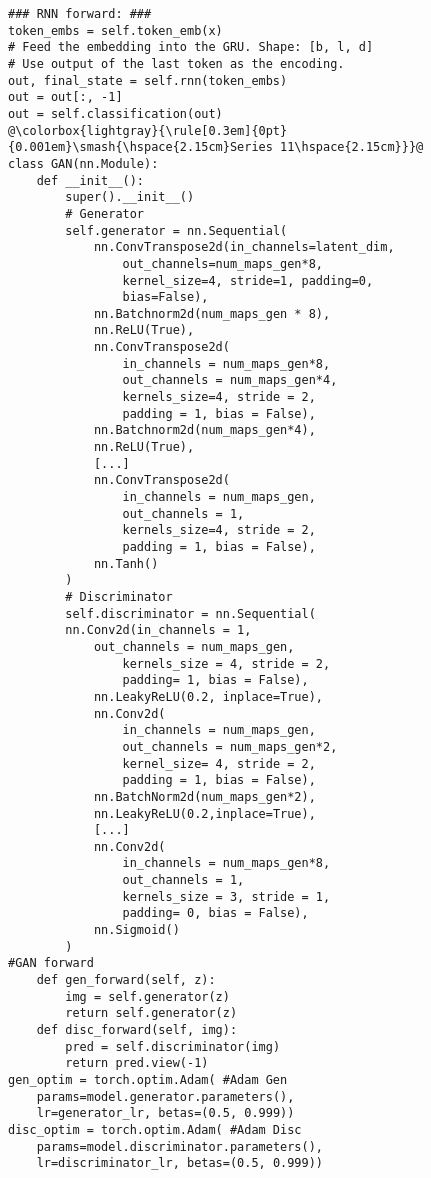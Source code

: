 \begin{lstlisting}[style=mypython]
### RNN forward: ###
token_embs = self.token_emb(x)
# Feed the embedding into the GRU. Shape: [b, l, d]
# Use output of the last token as the encoding.
out, final_state = self.rnn(token_embs)
out = out[:, -1]
out = self.classification(out)
@\colorbox{lightgray}{\rule[0.3em]{0pt}{0.001em}\smash{\hspace{2.15cm}Series 11\hspace{2.15cm}}}@
class GAN(nn.Module):
    def __init__():
        super().__init__()
        # Generator
        self.generator = nn.Sequential(
            nn.ConvTranspose2d(in_channels=latent_dim,
                out_channels=num_maps_gen*8,
                kernel_size=4, stride=1, padding=0,
                bias=False),
            nn.Batchnorm2d(num_maps_gen * 8),
            nn.ReLU(True),
            nn.ConvTranspose2d(
                in_channels = num_maps_gen*8, 
                out_channels = num_maps_gen*4,
                kernels_size=4, stride = 2,
                padding = 1, bias = False),
            nn.Batchnorm2d(num_maps_gen*4),
            nn.ReLU(True),
            [...]
            nn.ConvTranspose2d(
                in_channels = num_maps_gen,
                out_channels = 1,
                kernels_size=4, stride = 2,
                padding = 1, bias = False),
            nn.Tanh()
        )
        # Discriminator
        self.discriminator = nn.Sequential(
        nn.Conv2d(in_channels = 1,
            out_channels = num_maps_gen,
                kernels_size = 4, stride = 2,
                padding= 1, bias = False),
            nn.LeakyReLU(0.2, inplace=True),
            nn.Conv2d(
                in_channels = num_maps_gen,
                out_channels = num_maps_gen*2,
                kernel_size= 4, stride = 2,
                padding = 1, bias = False),
            nn.BatchNorm2d(num_maps_gen*2),
            nn.LeakyReLU(0.2,inplace=True),
            [...]
            nn.Conv2d(
                in_channels = num_maps_gen*8,
                out_channels = 1, 
                kernels_size = 3, stride = 1,
                padding= 0, bias = False),
            nn.Sigmoid()
        )
#GAN forward
    def gen_forward(self, z):    
        img = self.generator(z)
        return self.generator(z)
    def disc_forward(self, img):
        pred = self.discriminator(img)
        return pred.view(-1)
gen_optim = torch.optim.Adam( #Adam Gen
    params=model.generator.parameters(), 
    lr=generator_lr, betas=(0.5, 0.999))
disc_optim = torch.optim.Adam( #Adam Disc
    params=model.discriminator.parameters(), 
    lr=discriminator_lr, betas=(0.5, 0.999))

\end{lstlisting}
